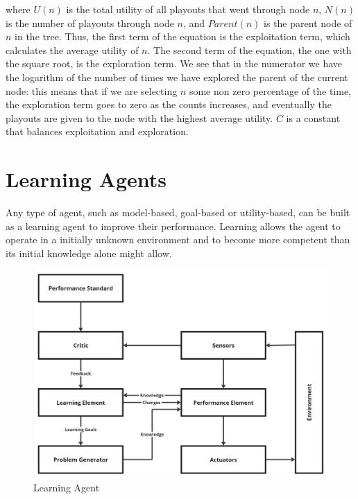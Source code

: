 \documentclass{article}
\begin{document}
\noindent where $U(n)$ is the total utility of all playouts that went through node $n$, $N(n)$ is the number of playouts through node $n$, and $Parent(n)$ is the parent node of $n$ in the tree. Thus, the first term of the equation is the exploitation term, which calculates the average utility of $n$. The second term of the equation, the one with the square root, is the exploration term. We see that in the numerator we have the logarithm of the number of times we have explored the parent of the current node: this means that if we are selecting $n$ some non zero percentage of the time, the exploration term goes to zero as the counts increases, and eventually the playouts are given to the node with the highest average utility. $C$ is a constant that balances exploitation and exploration.

\newpage
\section{Learning Agents}
Any type of agent, such as model-based, goal-based or utility-based, can be built as a learning agent to improve their performance. Learning allows the agent to operate in a initially unknown environment and to become more competent than its initial knowledge alone might allow. 

\begin{figure}[h]
    \centering
    \includegraphics[width=0.75\linewidth]{images/Learning Agent.jpg}
    \caption{Learning Agent}
    \label{fig:learning_agent}
\end{figure}
\end{document}

